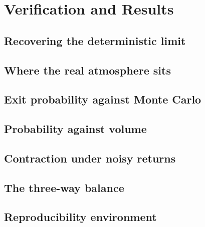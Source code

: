 
\section{Verification and Results}
\label{p3:sec:verification}

\subsection{Recovering the deterministic limit}
\label{p3:sub:recovering_deterministic_limit}

\subsection{Where the real atmosphere sits}
\label{p3:sub:real_atmosphere_results}

\subsection{Exit probability against Monte Carlo}
\label{p3:sub:exit_probability_vs_monte_carlo}

\subsection{Probability against volume}
\label{p3:sub:probability_against_volume}

\subsection{Contraction under noisy returns}
\label{p3:sub:contraction_under_noisy_returns}

\subsection{The three-way balance}
\label{p3:sub:three_way_balance}

\subsection{Reproducibility environment}
\label{p3:sub:reproducibility}
